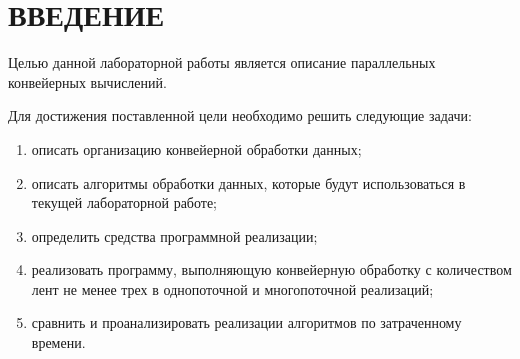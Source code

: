 \chapter*{ВВЕДЕНИЕ}

Целью данной лабораторной работы является описание параллельных конвейерных вычислений.

Для достижения поставленной цели необходимо решить следующие задачи:
\begin{enumerate}
	\item описать организацию конвейерной обработки данных;
	\item описать алгоритмы обработки данных, которые будут использоваться в текущей лабораторной работе;
	\item определить средства программной реализации;
	\item реализовать программу, выполняющую конвейерную обработку с количеством лент не менее трех в однопоточной и многопоточной реализаций;
	\item сравнить и проанализировать реализации алгоритмов по затраченному времени.
\end{enumerate}
